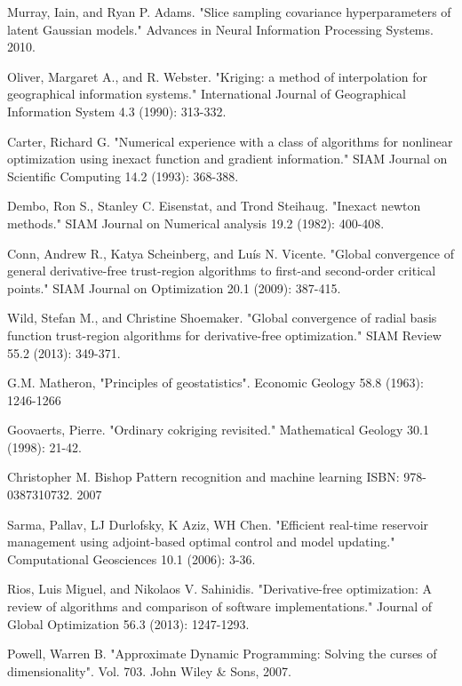 \documentclass[a4paper,onecolumn]{article}
\theoremstyle{remark}
\begin{document}
\begin{thebibliography}{9}
Murray, Iain, and Ryan P. Adams. 
"Slice sampling covariance hyperparameters of latent Gaussian models." 
Advances in Neural Information Processing Systems. 2010.

Oliver, Margaret A., and R. Webster. 
"Kriging: a method of interpolation for geographical information systems." 
International Journal of Geographical Information System 4.3 (1990): 313-332.

Carter, Richard G. 
"Numerical experience with a class of algorithms for nonlinear optimization using inexact function and gradient information." 
SIAM Journal on Scientific Computing 14.2 (1993): 368-388.

Dembo, Ron S., Stanley C. Eisenstat, and Trond Steihaug. 
"Inexact newton methods." 
SIAM Journal on Numerical analysis 19.2 (1982): 400-408.

Conn, Andrew R., Katya Scheinberg, and Luís N. Vicente. 
"Global convergence of general derivative-free trust-region algorithms to first-and second-order critical points." 
SIAM Journal on Optimization 20.1 (2009): 387-415.

Wild, Stefan M., and Christine Shoemaker. 
"Global convergence of radial basis function trust-region algorithms for derivative-free optimization." 
SIAM Review 55.2 (2013): 349-371.

G.M. Matheron,
"Principles of geostatistics".
Economic Geology 58.8 (1963): 1246-1266

Goovaerts, Pierre. 
"Ordinary cokriging revisited." 
Mathematical Geology 30.1 (1998): 21-42.

Christopher M. Bishop
Pattern recognition and machine learning
ISBN: 978-0387310732. 2007

Sarma, Pallav, LJ Durlofsky, K Aziz, WH Chen. 
"Efficient real-time reservoir management using adjoint-based optimal control and model updating." 
Computational Geosciences 10.1 (2006): 3-36.

Rios, Luis Miguel, and Nikolaos V. Sahinidis. 
"Derivative-free optimization: A review of algorithms and comparison of software implementations." 
Journal of Global Optimization 56.3 (2013): 1247-1293.

Powell, Warren B.
"Approximate Dynamic Programming: Solving the curses of dimensionality".
Vol. 703. John Wiley \& Sons, 2007.


\end{thebibliography}
\end{document}
